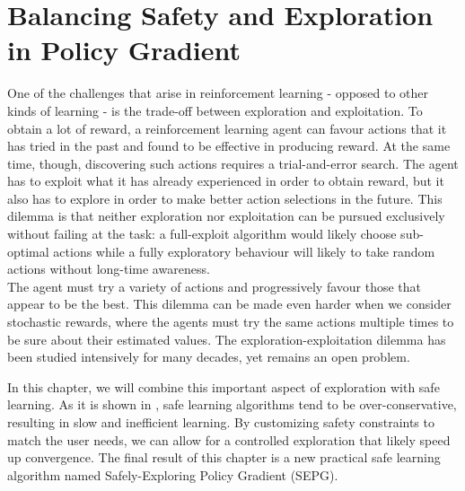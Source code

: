 \chapter{Balancing Safety and Exploration in Policy Gradient}
\label{ch:balance}

\fancyhead[LE,RO]{\bfseries\thepage}                               
\fancyhead[LO]{\bfseries\rightmark}  


One of the challenges that arise in reinforcement learning - opposed to other kinds of learning - is the trade-off between exploration and exploitation. To obtain a lot of reward, a reinforcement learning agent can favour actions that it has tried in the past and found to be effective in producing reward. At the same time, though, discovering such actions requires a trial-and-error search. The agent has to exploit what it has already experienced in order to obtain reward, but it also has to explore in order to make better action selections in the future. This dilemma is that neither exploration nor exploitation can be pursued exclusively without failing at the task: a full-exploit algorithm would likely choose sub-optimal actions while a fully exploratory behaviour will likely to take random actions without long-time awareness.\\
The agent must try a variety of actions and progressively favour those that appear to be the best. This dilemma can be made even harder when we consider stochastic rewards, where the agents must try the same actions multiple times to be sure about their estimated values. The exploration-exploitation dilemma has been studied intensively for many decades, yet remains an open problem. 

In this chapter, we will combine this important aspect of exploration with safe learning. As it is shown in , safe learning algorithms tend to be over-conservative, resulting in slow and inefficient learning. By customizing safety constraints to match the user needs, we can allow for a controlled exploration that likely speed up convergence. The final result of this chapter is a new practical safe learning algorithm named Safely-Exploring Policy Gradient (SEPG). 

